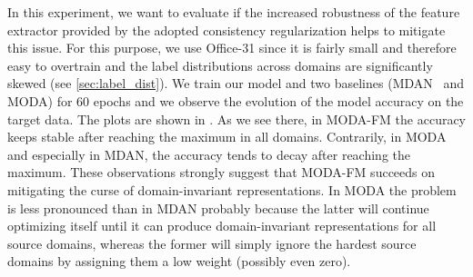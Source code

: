 In this experiment, we want to evaluate if the increased robustness of the feature extractor provided by the adopted consistency regularization helps to mitigate this issue. For this purpose, we use Office-31 since it is fairly small and therefore easy to overtrain and the label distributions across domains are significantly skewed (see \ref{sec:label_dist}). We train our model and two baselines (MDAN~\citep{Zhao2018} and MODA) for 60 epochs and we observe the evolution of the model accuracy on the target data. The plots are shown in . As we see there, in MODA-FM the accuracy keeps stable after reaching the maximum in all domains. Contrarily, in MODA and especially in MDAN, the accuracy tends to decay after reaching the maximum. These observations strongly suggest that MODA-FM succeeds on mitigating the curse of domain-invariant representations. In MODA the problem is less pronounced than in MDAN probably because the latter will continue optimizing itself until it can produce domain-invariant representations for all source domains, whereas the former will simply ignore the hardest source domains by assigning them a low weight (possibly even zero).

